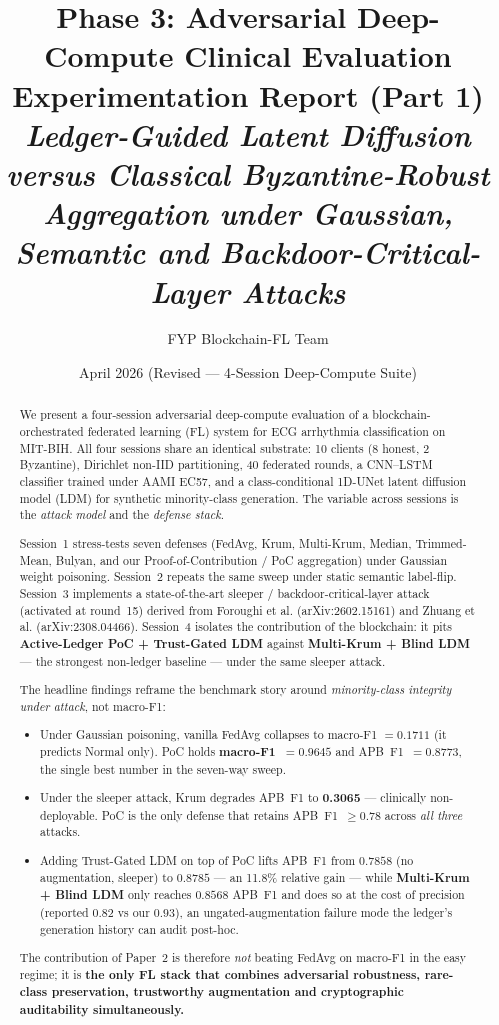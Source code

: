 \documentclass[11pt,a4paper]{article}
\title{
    \vspace{-1cm}
    \textbf{Phase 3: Adversarial Deep-Compute Clinical Evaluation} \\[0.3cm]
    \large Experimentation Report (Part 1) \\[0.2cm]
    \large\textit{Ledger-Guided Latent Diffusion versus Classical Byzantine-Robust}\\
    \large\textit{Aggregation under Gaussian, Semantic and Backdoor-Critical-Layer Attacks}
}
\author{FYP Blockchain-FL Team}
\date{April 2026 (Revised --- 4-Session Deep-Compute Suite)}
\begin{document}
\maketitle
\thispagestyle{fancy}

\begin{abstract}
We present a four-session adversarial deep-compute evaluation of a
blockchain-orchestrated federated learning (FL) system for ECG arrhythmia
classification on MIT-BIH. All four sessions share an identical substrate:
10 clients (8 honest, 2 Byzantine), Dirichlet non-IID partitioning, 40
federated rounds, a CNN--LSTM classifier trained under AAMI EC57, and a
class-conditional 1D-UNet latent diffusion model (LDM) for synthetic
minority-class generation. The variable across sessions is the
\textit{attack model} and the \textit{defense stack}.

Session~1 stress-tests seven defenses (FedAvg, Krum, Multi-Krum, Median,
Trimmed-Mean, Bulyan, and our Proof-of-Contribution / PoC aggregation) under
Gaussian weight poisoning. Session~2 repeats the same sweep under static
semantic label-flip. Session~3 implements a state-of-the-art sleeper /
backdoor-critical-layer attack (activated at round~15) derived from
Foroughi et al. (arXiv:2602.15161) and Zhuang et al. (arXiv:2308.04466).
Session~4 isolates the contribution of the blockchain: it pits
\textbf{Active-Ledger PoC + Trust-Gated LDM} against \textbf{Multi-Krum +
Blind LDM} --- the strongest non-ledger baseline --- under the same sleeper
attack.

The headline findings reframe the benchmark story around \textit{minority-class
integrity under attack}, not macro-F1:
\begin{itemize}[nosep]
    \item Under Gaussian poisoning, vanilla FedAvg collapses to macro-F1
          $=0.1711$ (it predicts Normal only). PoC holds
          \textbf{macro-F1~$=0.9645$} and APB~F1~$=0.8773$, the single best
          number in the seven-way sweep.
    \item Under the sleeper attack, Krum degrades APB~F1 to
          \textbf{0.3065} --- clinically non-deployable. PoC is the only
          defense that retains APB~F1~$\geq 0.78$ across \textit{all three}
          attacks.
    \item Adding Trust-Gated LDM on top of PoC lifts APB~F1 from
          $0.7858$ (no augmentation, sleeper) to
          \textbf{$0.8785$} --- an 11.8\% relative gain --- while
          \textbf{Multi-Krum + Blind LDM} only reaches $0.8568$ APB~F1 and
          does so at the cost of precision (reported $0.82$ vs our $0.93$),
          an ungated-augmentation failure mode the ledger's generation
          history can audit post-hoc.
\end{itemize}
The contribution of Paper~2 is therefore \textit{not} beating FedAvg on
macro-F1 in the easy regime; it is \textbf{the only FL stack that combines
adversarial robustness, rare-class preservation, trustworthy
augmentation and cryptographic auditability simultaneously.}
\end{abstract}
\end{document}
